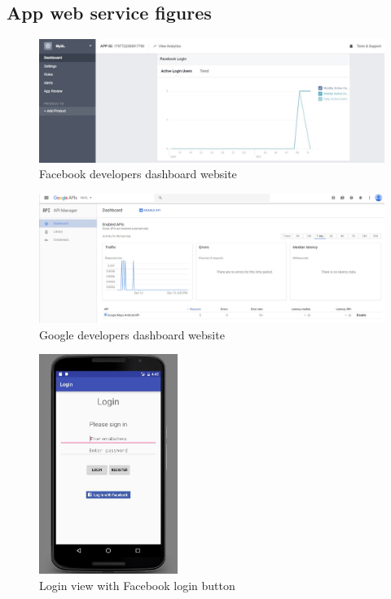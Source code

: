 \documentclass[11pt,twoside,a4paper]{report}
\begin{document}
\begin{appendices}
\chapter{App web service figures}
\label{appendix:app-web-service-figures}
\newpage

\begin{figure}
	\centering
	\includegraphics[width=1\textwidth]{jpg/facebook-developers.jpg}
	\caption{Facebook developers dashboard website}
	\label{figure:start-view}
\end{figure}

\begin{figure}
	\centering
	\includegraphics[width=1\textwidth]{jpg/google-developers.jpg}
	\caption{Google developers dashboard website}
	\label{figure:navigation-drawer-in-start-view}
\end{figure}

\begin{figure}
	\centering
	\includegraphics[width=0.4\textwidth]{jpg/facebook1.jpg}
	\caption{Login view with Facebook login button}
	\label{figure:navigation-drawer-in-start-view}
\end{figure}


\end{appendices}
\end{document}
